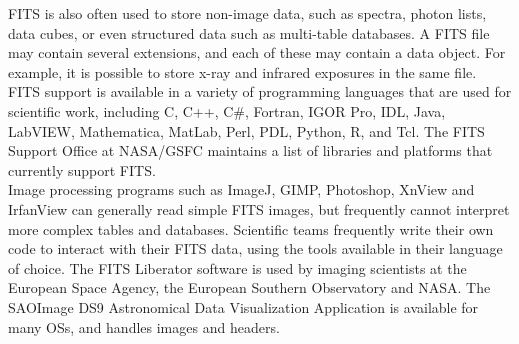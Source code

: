 FITS is also often used to store non-image data, such as spectra, photon lists, data cubes, or even structured data such as multi-table databases. A FITS file may contain several extensions, and each of these may contain a data object. For example, it is possible to store x-ray and infrared exposures in the same file.\\
 
FITS support is available in a variety of programming languages that are used for scientific work, including C, C++, C\#, Fortran, IGOR Pro, IDL, Java, LabVIEW, Mathematica, MatLab, Perl, PDL, Python, R, and Tcl. The FITS Support Office at NASA/GSFC maintains a list of libraries and platforms that currently support FITS.\\
 
Image processing programs such as ImageJ, GIMP, Photoshop, XnView and IrfanView can generally read simple FITS images, but frequently cannot interpret more complex tables and databases. Scientific teams frequently write their own code to interact with their FITS data, using the tools available in their language of choice. The FITS Liberator software is used by imaging scientists at the European Space Agency, the European Southern Observatory and NASA. The SAOImage DS9 Astronomical Data Visualization Application is available for many OSs, and handles images and headers.\\

